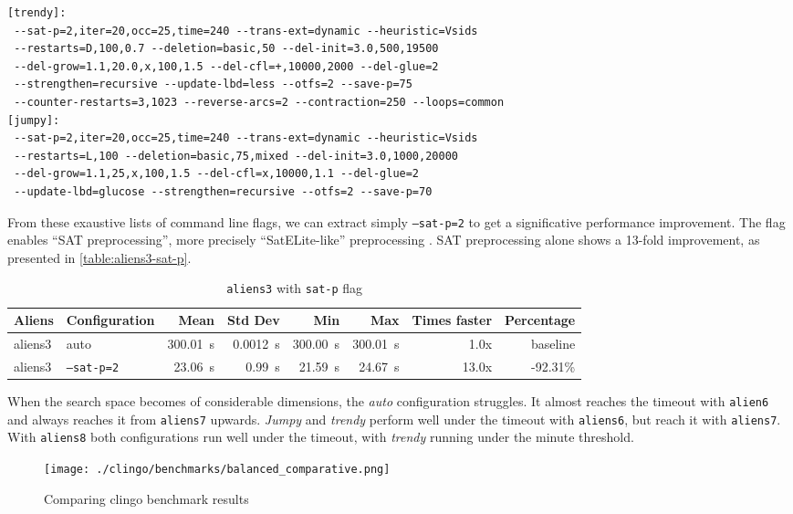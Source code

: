 \documentclass[11pt]{article}
\begin{document}
\begin{verbatim}
[trendy]:
 --sat-p=2,iter=20,occ=25,time=240 --trans-ext=dynamic --heuristic=Vsids
 --restarts=D,100,0.7 --deletion=basic,50 --del-init=3.0,500,19500
 --del-grow=1.1,20.0,x,100,1.5 --del-cfl=+,10000,2000 --del-glue=2
 --strengthen=recursive --update-lbd=less --otfs=2 --save-p=75
 --counter-restarts=3,1023 --reverse-arcs=2 --contraction=250 --loops=common
[jumpy]:
 --sat-p=2,iter=20,occ=25,time=240 --trans-ext=dynamic --heuristic=Vsids
 --restarts=L,100 --deletion=basic,75,mixed --del-init=3.0,1000,20000
 --del-grow=1.1,25,x,100,1.5 --del-cfl=x,10000,1.1 --del-glue=2
 --update-lbd=glucose --strengthen=recursive --otfs=2 --save-p=70
\end{verbatim}

From these exaustive lists of command line flags, we can extract simply \texttt{--sat-p=2} to get a significative performance improvement.
The flag enables ``SAT preprocessing'', more precisely ``SatELite-like'' preprocessing \cite{clingo-guide}.
SAT preprocessing alone shows a 13-fold improvement, as presented in \autoref{table:aliens3-sat-p}.

\begin{table}
  \centering
  \begin{tabular}{|llrrrrrr|}
    \hline
    Aliens & Configuration & Mean & Std Dev & Min & Max & Times faster & Percentage \\
    \hline
    aliens3 & auto & 300.01~s & 0.0012~s & 300.00~s & 300.01~s & 1.0x & baseline \\
    aliens3 & \texttt{--sat-p=2} & 23.06~s & 0.99~s & 21.59~s & 24.67~s & 13.0x & -92.31\% \\
    \hline
  \end{tabular}
  \caption{\texttt{aliens3} with \texttt{sat-p} flag}
  \label{table:aliens3-sat-p}
\end{table}

When the search space becomes of considerable dimensions, the \textit{auto} configuration struggles.
It almost reaches the timeout with \texttt{alien6} and always reaches it from \texttt{aliens7} upwards.
\textit{Jumpy} and \textit{trendy} perform well under the timeout with \texttt{aliens6}, but reach it with \texttt{aliens7}.
With \texttt{aliens8} both configurations run well under the timeout, with \textit{trendy} running under the minute threshold.

\begin{figure}[h]
  \centering
  \texttt{[image: ./clingo/benchmarks/balanced\_comparative.png]}
  \caption{Comparing clingo benchmark results}
  \label{fig:clingo-bench-comparative}
\end{figure}
\end{document}
